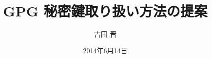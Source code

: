 




\documentclass[cjk,dvipdfmx,12pt]{beamer}
\usepackage{monthlypresentation}
\usepackage{listings}

\usepackage{ulem}




\title{GPG 秘密鍵取り扱い方法の提案}
\subtitle{}
\author{吉田 晋}
\date{2014年6月14日}


